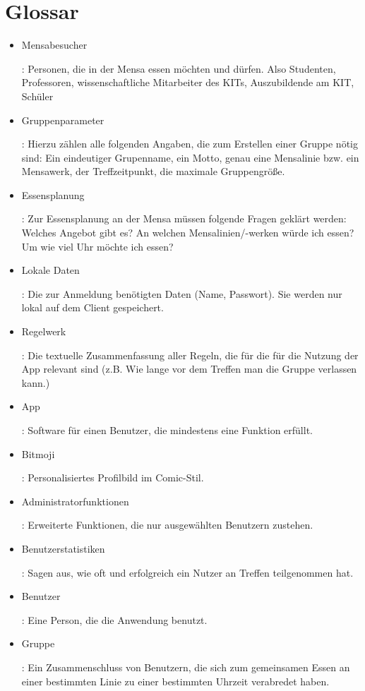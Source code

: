 \documentclass[a4paper]{scrreprt}
\begin{document}
\chapter{Glossar}
 \begin{itemize}
 \item \hypertarget{label1}{Mensabesucher}: Personen, die in der Mensa essen möchten und dürfen. Also Studenten, Professoren, wissenschaftliche Mitarbeiter des KITs, Auszubildende am KIT, Schüler
 \item \hypertarget{label2}{Gruppenparameter}: Hierzu zählen alle folgenden Angaben, die zum Erstellen einer Gruppe nötig sind: Ein eindeutiger Grupenname, ein Motto, genau eine Mensalinie bzw. ein Mensawerk, der Treffzeitpunkt, die maximale Gruppengröße.
\item \hypertarget{label3}{Essensplanung}: Zur Essensplanung an der Mensa müssen folgende Fragen geklärt werden: Welches Angebot gibt es? An welchen Mensalinien/-werken würde ich essen? Um wie viel Uhr möchte ich essen? 
\item \hypertarget{label4}{Lokale Daten}: Die zur Anmeldung benötigten Daten (Name, Passwort). Sie werden nur lokal auf dem Client gespeichert.
\item \hypertarget{label5}{Regelwerk}: Die textuelle Zusammenfassung aller Regeln, die für die für die Nutzung der App relevant sind (z.B. Wie lange vor dem Treffen man die Gruppe verlassen kann.)
\item \hypertarget{label6}{App}: Software für einen Benutzer, die mindestens eine Funktion erfüllt.
\item \hypertarget{label7}{Bitmoji}: Personalisiertes Profilbild im Comic-Stil.
\item \hypertarget{label8}{Administratorfunktionen}: Erweiterte Funktionen, die nur ausgewählten Benutzern zustehen.
\item \hypertarget{label9}{Benutzerstatistiken}: Sagen aus, wie oft und erfolgreich ein Nutzer an Treffen teilgenommen hat.
\item \hypertarget{benutzer}{Benutzer}: Eine Person, die die Anwendung benutzt.
\item \hypertarget{gruppe}{Gruppe}: Ein Zusammenschluss von Benutzern, die sich zum gemeinsamen Essen an einer bestimmten Linie zu einer bestimmten Uhrzeit verabredet haben.
  
 \end{itemize}
 
\end{document}
